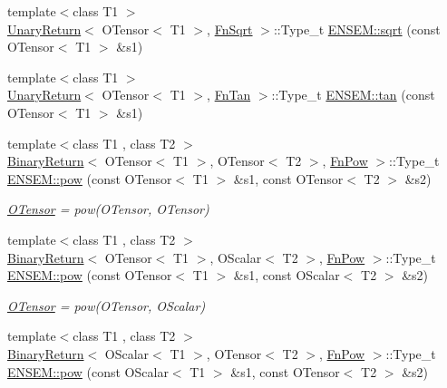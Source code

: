 \begin{DoxyCompactItemize}
\item 
{\footnotesize template$<$class T1 $>$ }\\\mbox{\hyperlink{structUnaryReturn}{Unary\+Return}}$<$ O\+Tensor$<$ T1 $>$, \mbox{\hyperlink{structFnSqrt}{Fn\+Sqrt}} $>$\+::Type\+\_\+t \mbox{\hyperlink{group__obstensor_gab4101323c19945bf42cbece4b0c2e8b4}{E\+N\+S\+E\+M\+::sqrt}} (const O\+Tensor$<$ T1 $>$ \&s1)
\item 
{\footnotesize template$<$class T1 $>$ }\\\mbox{\hyperlink{structUnaryReturn}{Unary\+Return}}$<$ O\+Tensor$<$ T1 $>$, \mbox{\hyperlink{structFnTan}{Fn\+Tan}} $>$\+::Type\+\_\+t \mbox{\hyperlink{group__obstensor_gaaea33431d7f292c563a371d23c31eb07}{E\+N\+S\+E\+M\+::tan}} (const O\+Tensor$<$ T1 $>$ \&s1)
\item 
{\footnotesize template$<$class T1 , class T2 $>$ }\\\mbox{\hyperlink{structBinaryReturn}{Binary\+Return}}$<$ O\+Tensor$<$ T1 $>$, O\+Tensor$<$ T2 $>$, \mbox{\hyperlink{structFnPow}{Fn\+Pow}} $>$\+::Type\+\_\+t \mbox{\hyperlink{group__obstensor_ga94691b9c2a192ce60f55f93a4ccf1974}{E\+N\+S\+E\+M\+::pow}} (const O\+Tensor$<$ T1 $>$ \&s1, const O\+Tensor$<$ T2 $>$ \&s2)
\begin{DoxyCompactList}\small\item\em \mbox{\hyperlink{classENSEM_1_1OTensor}{O\+Tensor}} = pow(\+O\+Tensor, O\+Tensor) \end{DoxyCompactList}\item 
{\footnotesize template$<$class T1 , class T2 $>$ }\\\mbox{\hyperlink{structBinaryReturn}{Binary\+Return}}$<$ O\+Tensor$<$ T1 $>$, O\+Scalar$<$ T2 $>$, \mbox{\hyperlink{structFnPow}{Fn\+Pow}} $>$\+::Type\+\_\+t \mbox{\hyperlink{group__obstensor_ga5d6fdaa96c08e10d2006c495cb0af217}{E\+N\+S\+E\+M\+::pow}} (const O\+Tensor$<$ T1 $>$ \&s1, const O\+Scalar$<$ T2 $>$ \&s2)
\begin{DoxyCompactList}\small\item\em \mbox{\hyperlink{classENSEM_1_1OTensor}{O\+Tensor}} = pow(\+O\+Tensor, O\+Scalar) \end{DoxyCompactList}\item 
{\footnotesize template$<$class T1 , class T2 $>$ }\\\mbox{\hyperlink{structBinaryReturn}{Binary\+Return}}$<$ O\+Scalar$<$ T1 $>$, O\+Tensor$<$ T2 $>$, \mbox{\hyperlink{structFnPow}{Fn\+Pow}} $>$\+::Type\+\_\+t \mbox{\hyperlink{group__obstensor_ga5f02683bb668851c7df8a84ba438b0fb}{E\+N\+S\+E\+M\+::pow}} (const O\+Scalar$<$ T1 $>$ \&s1, const O\+Tensor$<$ T2 $>$ \&s2)

\end{DoxyCompactItemize}
